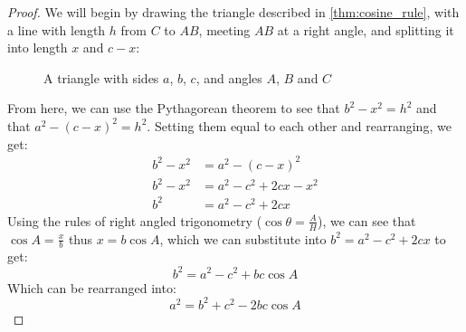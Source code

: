         \begin{proof}
            We will begin by drawing the triangle described in \ref{thm:cosine_rule}, with a line with length $h$ from $C$ to $AB$, meeting $AB$ at a right angle, and splitting it into length $x$ and $c-x$:
            \begin{figure}
                \begin{center}
                    \caption{A triangle with sides $a$, $b$, $c$, and angles $A$, $B$ and $C$}
                \end{center}
            \end{figure}
            From here, we can use the Pythagorean theorem to see that $b^2-x^2=h^2$ and that $a^2-(c-x)^2=h^2$.
            Setting them equal to each other and rearranging, we get:
            \begin{equation*}
                \begin{aligned}
                    b^2-x^2&=a^2-(c-x)^2 \\
                    b^2-x^2&=a^2-c^2+2cx-x^2 \\
                    b^2&=a^2-c^2+2cx
                \end{aligned}
            \end{equation*}
            Using the rules of right angled trigonometry ($\cos\theta=\frac{A}{H}$), we can see that $\cos A=\frac{x}{b}$ thus $x=b\cos A$, which we can substitute into $b^2=a^2-c^2+2cx$ to get:
            \begin{equation}
                b^2=a^2-c^2+bc\cos A
            \end{equation}
            Which can be rearranged into:
            \begin{equation}
                a^2=b^2+c^2-2bc\cos A
            \end{equation}
        \end{proof}

